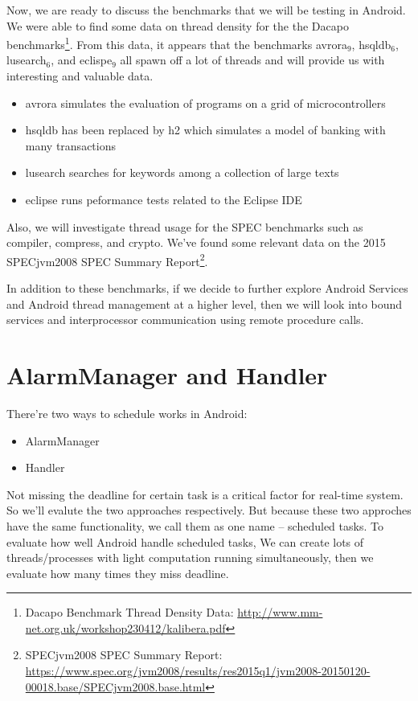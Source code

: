 \documentclass[11pt]{article}
\begin{document}
Now, we are ready to discuss the benchmarks that we will be testing in Android.  We were able to find some data on thread density for the the Dacapo benchmarks\footnote{Dacapo Benchmark Thread Density Data: \url{http://www.mm-net.org.uk/workshop230412/kalibera.pdf}}.  From this data, it appears that the benchmarks avrora$_{\text{9}}$, hsqldb$_{\text{6}}$, lusearch$_{\text{6}}$, and eclispe$_{\text{9}}$ all spawn off a lot of threads and will provide us with interesting and valuable data.

\begin{itemize}
\item avrora simulates the evaluation of programs on a grid of microcontrollers
\item hsqldb has been replaced by h2 which simulates a model of banking with many transactions
\item lusearch searches for keywords among a collection of large texts
\item eclipse runs peformance tests related to the Eclipse IDE
\end{itemize}

Also, we will investigate thread usage for the SPEC benchmarks such as compiler, compress, and crypto.  We’ve found some relevant data on the 2015 SPECjvm2008 SPEC Summary Report\footnote{SPECjvm2008 SPEC Summary Report: \url{https://www.spec.org/jvm2008/results/res2015q1/jvm2008-20150120-00018.base/SPECjvm2008.base.html}}.

In addition to these benchmarks, if we decide to further explore Android Services and Android thread management at a higher level, then we will look into bound services and interprocessor communication using remote procedure calls.

\section{AlarmManager and Handler}
\label{sec-6}
There're two ways to schedule works in Android:

\begin{itemize}
\item AlarmManager
\item Handler
\end{itemize}

Not missing the deadline for certain task is a critical factor for real-time system.
So we'll evalute the two approaches respectively.
But because these two approches have the same functionality,
we call them as one name -- scheduled tasks.
To evaluate how well Android handle scheduled tasks,
We can create lots of threads/processes with light computation running simultaneously,
then we evaluate how many times they miss deadline.
\end{document}

